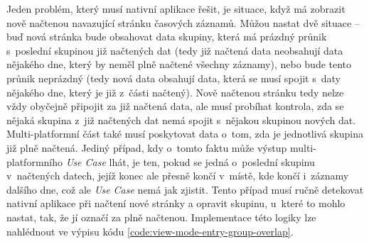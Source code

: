 Jeden problém, který musí nativní aplikace řešit, je situace, když má zobrazit nově načtenou navazující stránku časových záznamů. Můžou nastat dvě situace – buď nová stránka bude obsahovat data skupiny, která má prázdný průnik s~poslední skupinou již načtených dat (tedy již načtená data neobsahují data nějakého dne, který by neměl plně načtené všechny záznamy), nebo bude tento průnik neprázdný (tedy nová data obsahují data, která se musí spojit s~daty nějakého dne, který je již z~části načtený). Nově načtenou stránku tedy nelze vždy obyčejně připojit za již načtená data, ale musí probíhat kontrola, zda se nějaká skupina z~již načtených dat nemá spojit s~nějakou skupinou nových dat. Multi-platformní část také musí poskytovat data o~tom, zda je jednotlivá skupina již plně načtená. Jediný případ, kdy o~tomto faktu může výstup multi-platformního \emph{Use Case} lhát, je ten, pokud se jedná o~poslední skupinu v~načtených datech, jejíž konec ale přesně končí v~místě, kde končí i~záznamy dalšího dne, což ale \emph{Use Case} nemá jak zjistit. Tento případ musí ručně detekovat nativní aplikace při načtení nové stránky a opravit skupinu, u~které to mohlo nastat, tak, že jí označí za plně načtenou. Implementace této logiky lze nahlédnout ve výpisu kódu \ref{code:view-mode-entry-group-overlap}.

